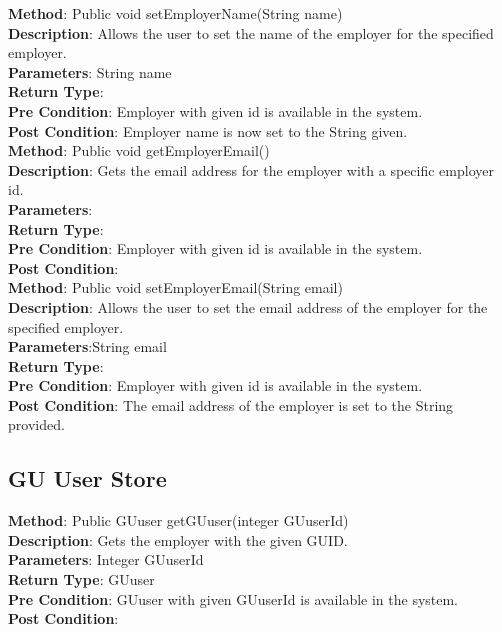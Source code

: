 \documentclass{l3deliverable}
\begin{document}
\textbf{Method}: Public void setEmployerName(String name)\\
\textbf{Description}: Allows the user to set the name of the employer for the specified employer.\\
\textbf{Parameters}: String name\\
\textbf{Return Type}:\\
\textbf{Pre Condition}: Employer with given id is available in the system.\\
\textbf{Post Condition}: Employer name is now set to the String given.\\

\textbf{Method}: Public void getEmployerEmail()\\
\textbf{Description}: Gets the email address for the employer with a specific employer id.\\
\textbf{Parameters}:\\
\textbf{Return Type}:\\
\textbf{Pre Condition}: Employer with given id is available in the system.\\
\textbf{Post Condition}:\\

\textbf{Method}: Public void setEmployerEmail(String email)\\
\textbf{Description}: Allows the user to set the email address of the employer for the specified employer.\\
\textbf{Parameters}:String email\\
\textbf{Return Type}:\\
\textbf{Pre Condition}: Employer with given id is available in the system.\\
\textbf{Post Condition}: The email address of the employer is set to the String provided.\\

\subsection{GU User Store}

\textbf{Method}: Public GUuser getGUuser(integer GUuserId)\\
\textbf{Description}: Gets the employer with the given GUID.\\
\textbf{Parameters}: Integer GUuserId\\
\textbf{Return Type}: GUuser\\
\textbf{Pre Condition}: GUuser with given GUuserId is available in the system.\\
\textbf{Post Condition}:\\
\end{document}
